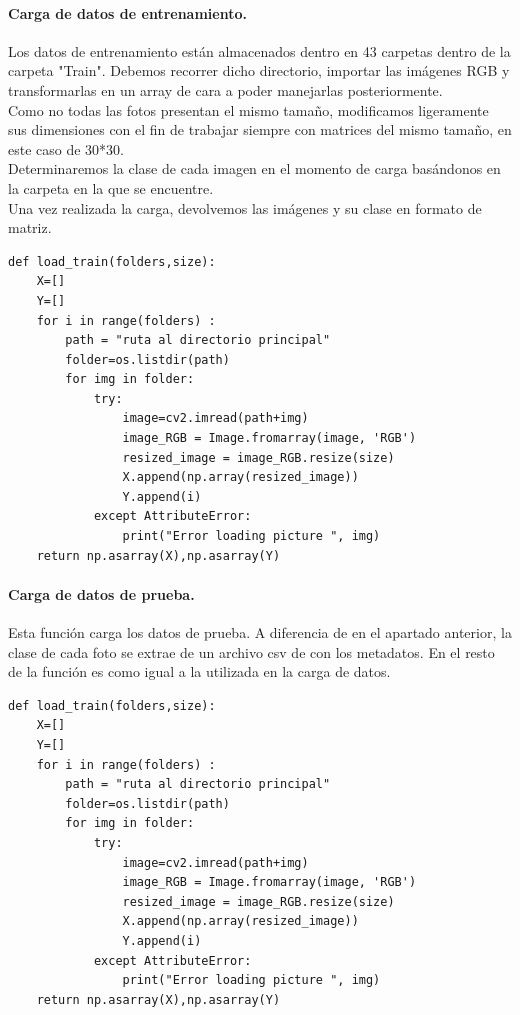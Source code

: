\documentclass[a4paper,10pt]{article}
\begin{document}
\paragraph{Carga de datos de entrenamiento.}
Los datos de entrenamiento están almacenados dentro en 43 carpetas dentro de la carpeta "Train". Debemos recorrer dicho directorio, importar las imágenes RGB y transformarlas en un array de cara a poder manejarlas posteriormente.\\
Como no todas las fotos presentan el mismo tamaño, modificamos ligeramente sus dimensiones con el fin de trabajar siempre con matrices del mismo tamaño, en este caso de 30*30.\\
Determinaremos la clase de cada imagen en el momento de carga basándonos en la carpeta en la que se encuentre. \\Una vez realizada la carga, devolvemos las imágenes y su clase en formato de matriz.
\begin{lstlisting}
def load_train(folders,size):
    X=[]
    Y=[]
    for i in range(folders) :
        path = "ruta al directorio principal"
        folder=os.listdir(path)
        for img in folder:
            try:
                image=cv2.imread(path+img)
                image_RGB = Image.fromarray(image, 'RGB')
                resized_image = image_RGB.resize(size)
                X.append(np.array(resized_image))
                Y.append(i)
            except AttributeError:
                print("Error loading picture ", img)
    return np.asarray(X),np.asarray(Y)
\end{lstlisting}

\paragraph{Carga de datos de prueba.}
Esta función carga los datos de prueba. A diferencia de en el apartado anterior, la clase de cada foto se extrae de un archivo csv de con los metadatos. En el resto de la función es como igual a la utilizada en la carga de datos.

\begin{lstlisting}
def load_train(folders,size):
    X=[]
    Y=[]
    for i in range(folders) :
        path = "ruta al directorio principal"
        folder=os.listdir(path)
        for img in folder:
            try:
                image=cv2.imread(path+img)
                image_RGB = Image.fromarray(image, 'RGB')
                resized_image = image_RGB.resize(size)
                X.append(np.array(resized_image))
                Y.append(i)
            except AttributeError:
                print("Error loading picture ", img)
    return np.asarray(X),np.asarray(Y)
\end{lstlisting}
\end{document}
